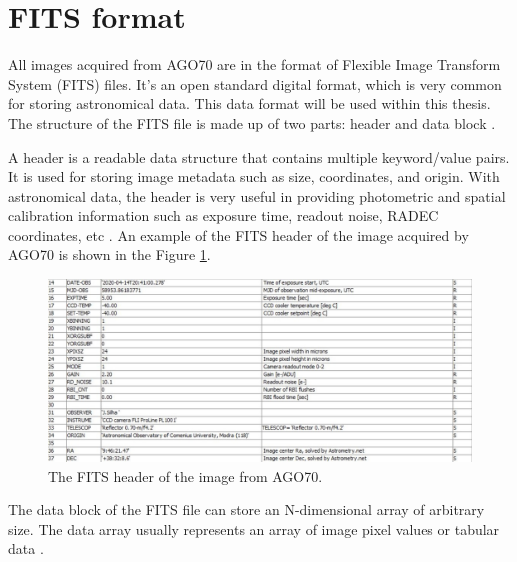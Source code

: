 \section{FITS format}
All images acquired from AGO70 are in the format of Flexible Image Transform System (FITS) files. It's an open standard digital format, which is very common for storing astronomical data. This data format will be used within this thesis. The structure of the FITS file is made up of two parts: header and data block \cite{fits}.

A header is a readable data structure that contains multiple keyword/value pairs. It is used for storing image metadata such as size, coordinates, and origin. With astronomical data, the header is very useful in providing photometric and spatial calibration information such as exposure time, readout noise, RADEC coordinates, etc \cite{fits}. An example of the FITS header of the image acquired by AGO70 is shown in the Figure \ref{img:fitsheader}. 

\begin{figure}[h]
    \centering
    \includegraphics[width=.9\textwidth]{images/fitsheader2.JPG}
    \caption{The FITS header of the image from AGO70.}
    \label{img:fitsheader}
\end{figure}

The data block of the FITS file can store an N-dimensional array of arbitrary size. The data array usually represents an array of image pixel values or tabular data \cite{fits}.